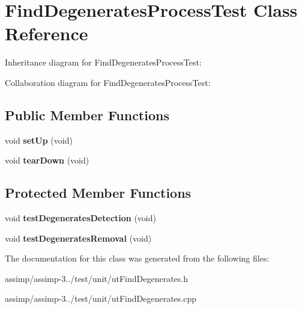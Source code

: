 \hypertarget{class_find_degenerates_process_test}{\section{Find\+Degenerates\+Process\+Test Class Reference}
\label{class_find_degenerates_process_test}
}


Inheritance diagram for Find\+Degenerates\+Process\+Test\+:


Collaboration diagram for Find\+Degenerates\+Process\+Test\+:
\subsection*{Public Member Functions}
\begin{DoxyCompactItemize}
\item 
\hypertarget{class_find_degenerates_process_test_a3b47e4254645a656db32e0d9e229129b}{void {\bfseries set\+Up} (void)}\label{class_find_degenerates_process_test_a3b47e4254645a656db32e0d9e229129b}

\item 
\hypertarget{class_find_degenerates_process_test_aac0fc3ed5435a9b3d93a3f6507c4c6ee}{void {\bfseries tear\+Down} (void)}\label{class_find_degenerates_process_test_aac0fc3ed5435a9b3d93a3f6507c4c6ee}

\end{DoxyCompactItemize}
\subsection*{Protected Member Functions}
\begin{DoxyCompactItemize}
\item 
\hypertarget{class_find_degenerates_process_test_a1af036b6a4aad6c469b38a78c61c73cc}{void {\bfseries test\+Degenerates\+Detection} (void)}\label{class_find_degenerates_process_test_a1af036b6a4aad6c469b38a78c61c73cc}

\item 
\hypertarget{class_find_degenerates_process_test_a81965dd207e912a01e52f1e4dd1d426a}{void {\bfseries test\+Degenerates\+Removal} (void)}\label{class_find_degenerates_process_test_a81965dd207e912a01e52f1e4dd1d426a}

\end{DoxyCompactItemize}


The documentation for this class was generated from the following files\+:\begin{DoxyCompactItemize}
\item 
assimp/assimp-\/3../test/unit/ut\+Find\+Degenerates.\+h\item 
assimp/assimp-\/3../test/unit/ut\+Find\+Degenerates.\+cpp\end{DoxyCompactItemize}

